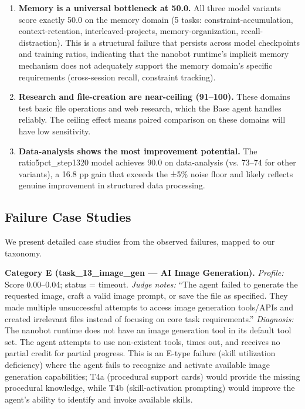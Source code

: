 \begin{enumerate}[leftmargin=2em, label=(\alph*), itemsep=1pt]

  \item \textbf{Memory is a universal bottleneck at 50.0.} All three model variants score exactly 50.0 on the memory domain (5 tasks: constraint-accumulation, context-retention, interleaved-projects, memory-organization, recall-distraction). This is a structural failure that persists across model checkpoints and training ratios, indicating that the nanobot runtime's implicit memory mechanism does not adequately support the memory domain's specific requirements (cross-session recall, constraint tracking).

  \item \textbf{Research and file-creation are near-ceiling (91--100).} These domains test basic file operations and web research, which the Base agent handles reliably. The ceiling effect means paired comparison on these domains will have low sensitivity.

  \item \textbf{Data-analysis shows the most improvement potential.} The ratio5pct\_step1320 model achieves 90.0 on data-analysis (vs. 73--74 for other variants), a 16.8 pp gain that exceeds the ±5\% noise floor and likely reflects genuine improvement in structured data processing.

\end{enumerate}


\subsection{Failure Case Studies}
\label{sec:exp:cases}

We present detailed case studies from the observed failures, mapped to our taxonomy.

\bigskip
\noindent\textbf{Category E (task\_13\_image\_gen --- AI Image Generation).}
\textit{Profile:} Score 0.00--0.04; status = timeout. \textit{Judge notes:} ``The agent failed to generate the requested image, craft a valid image prompt, or save the file as specified. They made multiple unsuccessful attempts to access image generation tools/APIs and created irrelevant files instead of focusing on core task requirements.'' \textit{Diagnosis:} The nanobot runtime does not have an image generation tool in its default tool set. The agent attempts to use non-existent tools, times out, and receives no partial credit for partial progress. This is an E-type failure (skill utilization deficiency) where the agent fails to recognize and activate available image generation capabilities; T4a (procedural support cards) would provide the missing procedural knowledge, while T4b (skill-activation prompting) would improve the agent's ability to identify and invoke available skills.

